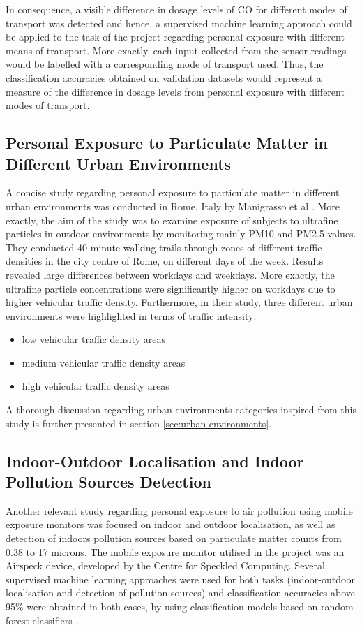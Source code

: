 \documentclass[bsc,frontabs,twoside,singlespacing, parskip,deptreport]{infthesis}     %
\begin{document}
In consequence, a visible difference in dosage levels of CO for different modes of transport was detected and hence, a supervised machine learning approach could be applied to the task of the project regarding personal exposure with different means of transport. More exactly, each input collected from the sensor readings would be labelled with a corresponding mode of transport used. Thus, the classification accuracies obtained on validation datasets would represent a measure of the difference in dosage levels from personal exposure with different modes of transport.

\subsection{Personal Exposure to Particulate Matter in Different Urban Environments}

A concise study regarding personal exposure to particulate matter in different urban environments was conducted in Rome, Italy by Manigrasso et al \cite{rome2017}. More exactly, the aim of the study was to examine exposure of subjects to ultrafine particles in outdoor environments by monitoring mainly PM10 and PM2.5 values. They conducted 40 minute walking trails through zones of different traffic densities in the city centre of Rome, on different days of the week. Results revealed large differences between workdays and weekdays. More exactly, the ultrafine particle concentrations were significantly higher on workdays due to higher vehicular traffic density. Furthermore,  in their study, three different urban environments were highlighted in terms of traffic intensity:
\begin{itemize}
\item low vehicular traffic density areas
\item medium vehicular traffic density areas
\item high vehicular traffic density areas
\end{itemize}
A thorough discussion regarding urban environments categories inspired from this study is further presented in section \ref{sec:urban-environments}.

\subsection{Indoor-Outdoor Localisation and Indoor Pollution Sources Detection}

Another relevant study \cite{buzatu2018} regarding personal exposure to air pollution using mobile exposure monitors was focused on indoor and outdoor localisation, as well as detection of indoors pollution sources based on particulate matter counts from 0.38 to 17 microns. The mobile exposure monitor utilised in the project was an Airspeck device, developed by the Centre for Speckled Computing. Several supervised machine learning approaches were used for both tasks (indoor-outdoor localisation and detection of pollution sources) and classification accuracies above 95\% were obtained in both cases, by using classification models based on random forest classifiers \cite{randomForest}.
\end{document}
